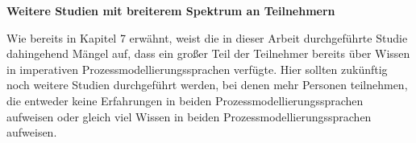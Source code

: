 \textbf{Weitere Studien mit breiterem Spektrum an Teilnehmern}

Wie bereits in Kapitel 7 erwähnt, weist die in dieser Arbeit durchgeführte Studie dahingehend Mängel auf, dass ein großer Teil der Teilnehmer bereits über Wissen in imperativen Prozessmodellierungssprachen verfügte. Hier sollten zukünftig noch weitere Studien durchgeführt werden, bei denen mehr Personen teilnehmen, die entweder keine Erfahrungen in beiden Prozessmodellierungssprachen aufweisen oder gleich viel Wissen in beiden Prozessmodellierungssprachen aufweisen.\newline




